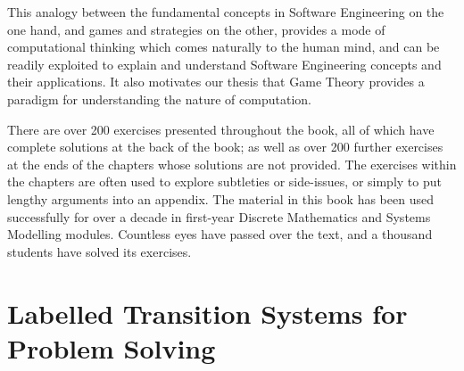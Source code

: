 \documentclass[sigconf]{acmart}
\begin{document}
This analogy between the fundamental concepts in
Software Engineering on the one hand, and games and strategies on the
other, provides a mode of computational thinking which comes naturally
to the human mind, and can be readily exploited to explain and
understand Software Engineering concepts and their applications.  It
also motivates our thesis that Game Theory provides a paradigm for
understanding the nature of computation. 

There are over 200 exercises presented throughout the book, all of
which have complete solutions at the back of the book; as well as over
200 further exercises at the ends of the chapters whose solutions are
not provided.  The exercises within the chapters are often used to
explore subtleties or side-issues, or simply to put lengthy arguments
into an appendix.  The material in this book has been used
successfully for over a decade in first-year Discrete Mathematics and
Systems Modelling modules. Countless eyes have passed over the text,
and a thousand students have solved its exercises.

\newcommand{\fb}[1]{\Big(\makebox[2.0em]{\tiny$\begin{array}{@{}c@{}c@{}c@{}}#1\end{array}$}\Big)}
\newcommand{\nofb}[1]{\makebox[2.0em]{\tiny$\begin{array}{@{}c@{}c@{}c@{}}#1\end{array}$}}

\section{Labelled Transition Systems for Problem Solving}
\end{document}
